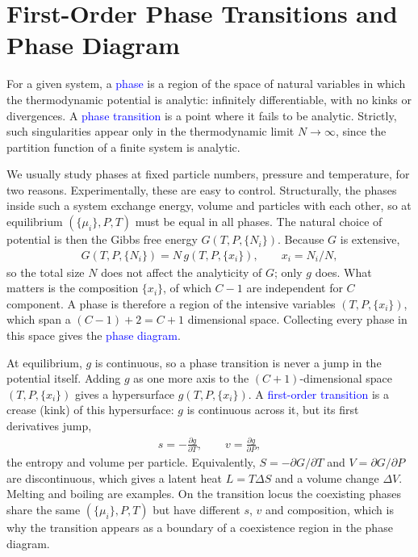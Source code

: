 \section{First-Order Phase Transitions and Phase Diagram}
For a given system, a \textcolor{blue}{phase} is a region of the space of natural
variables in which the thermodynamic potential is analytic: infinitely
differentiable, with no kinks or divergences. A \textcolor{blue}{phase transition}
is a point where it fails to be analytic. Strictly, such singularities appear only
in the thermodynamic limit $N\to\infty$, since the partition function of a finite
system is analytic.

We usually study phases at fixed particle numbers, pressure and temperature, for
two reasons. Experimentally, these are easy to control. Structurally, the phases
inside such a system exchange energy, volume and particles with each other, so at
equilibrium $(\{\mu_i\},P,T)$ must be equal in all phases. The natural choice of
potential is then the Gibbs free energy $G(T,P,\{N_i\})$. Because $G$ is extensive,
\begin{align*}
    G(T,P,\{N_i\}) = N\,g(T,P,\{x_i\}), \qquad x_i = N_i/N,
\end{align*}
so the total size $N$ does not affect the analyticity of $G$; only $g$ does.
What matters is the composition $\{x_i\}$, of which $C-1$ are independent for $C$ component. A phase is therefore a region of the intensive variables $(T,P,\{x_i\})$,
which span a $(C-1)+2=C+1$ dimensional space. Collecting every phase in this
space gives the \textcolor{blue}{phase diagram}.

At equilibrium, $g$ is continuous, so a phase transition is never a jump in the
potential itself. Adding $g$ as one more axis to the $(C+1)$-dimensional space
$(T,P,\{x_i\})$ gives a hypersurface $g(T,P,\{x_i\})$. A
\textcolor{blue}{first-order transition} is a crease (kink) of this hypersurface:
$g$ is continuous across it, but its first derivatives jump,
\begin{align*}
    s = -\frac{\partial g}{\partial T}, \qquad v = \frac{\partial g}{\partial P},
\end{align*}
the entropy and volume per particle. Equivalently, $S=-\partial G/\partial T$ and
$V=\partial G/\partial P$ are discontinuous, which gives a latent heat
$L = T\Delta S$ and a volume change $\Delta V$. Melting and boiling are
examples. On the transition locus the coexisting phases share the same
$(\{\mu_i\},P,T)$ but have different $s$, $v$ and composition, which is why the
transition appears as a boundary of a coexistence region in the phase diagram.

